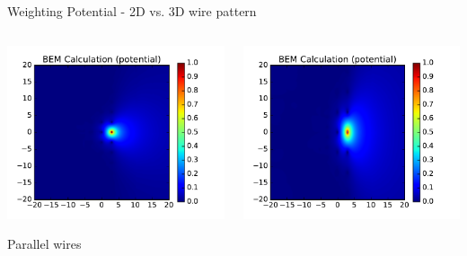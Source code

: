 \documentclass[xcolor=dvipsnames]{beamer}
\begin{document}
\begin{frame}{Weighting Potential - 2D vs. 3D wire pattern}

  \vspace{-5mm}

  \begin{columns}
    \begin{column}{0.5\textwidth}
      \begin{center}
        \includegraphics[height=0.65\textheight]{parallel-near-d11.pdf}

        \scriptsize Parallel wires
      \end{center}
    \end{column}
    \begin{column}{0.5\textwidth}
      \begin{center}
        \includegraphics[height=0.65\textheight]{uboone-near-d11.pdf}


\end{center}
\end{column}
\end{columns}
\end{frame}
\end{document}
